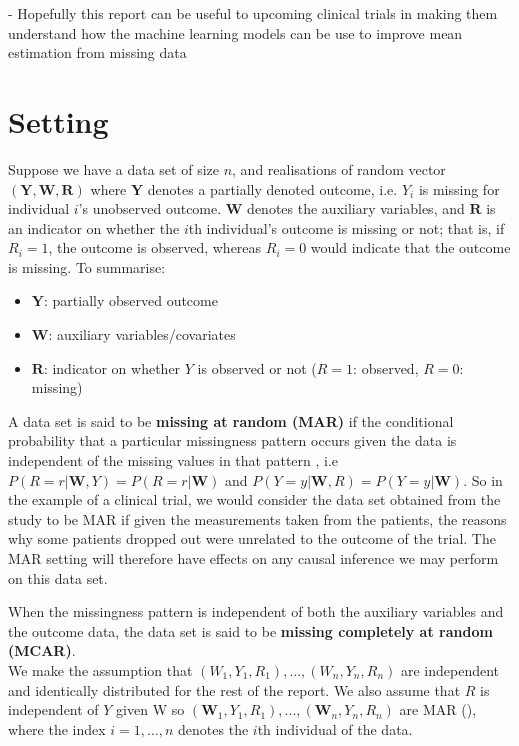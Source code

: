\documentclass[12pt,twoside]{article}
\begin{document}
- Hopefully this report can be useful to upcoming clinical trials in making them understand how the machine learning models can be use to improve mean estimation from missing data

\section{Setting} 

Suppose we have a data set of size $n$, and realisations of random vector $(\mathbf{Y}, \mathbf{W}, \mathbf{R})$ where $\mathbf{Y}$ denotes a partially denoted outcome, i.e. $Y_i$ is missing for individual $i$'s unobserved outcome. $\mathbf{W}$ denotes the auxiliary variables, and $\mathbf{R}$ is an indicator on whether the $i$th individual's outcome is missing or not; that is, if $R_i = 1$, the outcome is observed, whereas $R_i = 0$ would indicate that the outcome is missing.
To summarise:
\begin{itemize}
    \item $\mathbf{Y}$: partially observed outcome 
    \item $\mathbf{W}$: auxiliary variables/covariates 
    \item $\mathbf{R}$: indicator on whether $Y$ is observed or not ($R = 1$: observed, $R = 0$: missing) 
\end{itemize}

A data set is said to be \textbf{missing at random (MAR)} if the conditional probability that a particular missingness pattern occurs given the data is independent of the missing values in that pattern \citep{vansteelandt}, i.e $P(R=r|\mathbf{W}, Y) = P(R= r|\mathbf{W})$ and  $P(Y=y|\mathbf{W}, R) = P(Y=y|\mathbf{W})$. So in the example of a clinical trial, we would consider the data set obtained from the study to be MAR if given the measurements taken from the patients, the reasons why some patients dropped out were unrelated to the outcome of the trial. The MAR setting will therefore have effects on any causal inference we may perform on this data set.

When the missingness pattern is independent of both the auxiliary variables and the outcome data, the data set is said to be \textbf{missing completely at random (MCAR)}.\\

We make the assumption that $(W_1, Y_1, R_1),...,(W_n, Y_n, R_n)$ are independent and identically distributed for the rest of the report. We also assume that $R$ is independent of $Y$ given W so $(\mathbf{W}_1, Y_1, R_1), ... ,(\mathbf{W}_n, Y_n, R_n)$ are MAR (\citeauthor{vansteelandt}), where the index $i = 1,...,n$ denotes the $i$th individual of the data.\\
\end{document}
